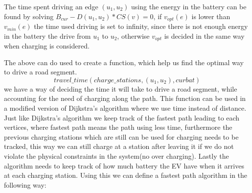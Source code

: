 The time spent driving an edge $(u_1, u_2)$ using the energy in the battery can be found by solving $B_{cur} - D(u_1, u_2) * CS(v) = 0$, if $v_{opt}(e)$ is lower than $v_{min}(e)$ the time used driving is set to infinity, since there is not enough energy in the battery the drive from $u_1$ to $u_2$, otherwise $v_{opt}$ is decided in the same way when charging is considered.   

The above can do used to create a function, which help us find the optimal way to drive a road segment. 
\[travel\_time(charge\_stations, (u_1, u_2), curbat) \]
we have a way of deciding the time it will take to drive a road segment, while accounting for the need of charging along the path. This function can be used in a modified version of Dijkstra's algorithm where we use time instead of distance. Just like Dijkstra's algorithm we keep track of the fastest path leading to each vertices, where fastest path means the path using less time, furthermore the previous charging stations which are still can be used for charging needs to be tracked, this way we can still charge at a station after leaving it if we do not violate the physical constraints in the system(no over charging). Lastly the algorithm needs to keep track of how much battery the EV have when it arrives at each charging station. Using this we can define a fastest path algorithm in the following way: 
